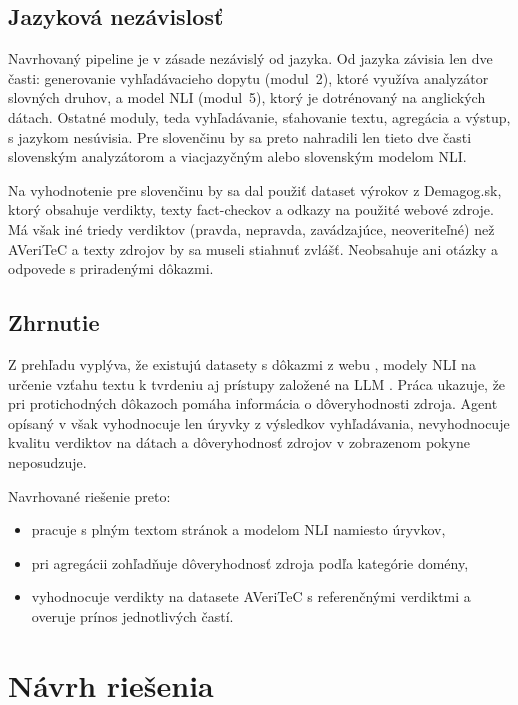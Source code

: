 \documentclass[a4paper,11pt]{article}
\begin{document}
\subsection{Jazyková nezávislosť}

Navrhovaný pipeline je v zásade nezávislý od jazyka. Od jazyka závisia len
dve časti: generovanie vyhľadávacieho dopytu (modul~2), ktoré využíva
analyzátor slovných druhov, a model NLI (modul~5), ktorý je dotrénovaný na
anglických dátach. Ostatné moduly, teda vyhľadávanie, sťahovanie textu,
agregácia a výstup, s jazykom nesúvisia. Pre slovenčinu by sa preto
nahradili len tieto dve časti slovenským analyzátorom a viacjazyčným alebo
slovenským modelom NLI.

Na vyhodnotenie pre slovenčinu by sa dal použiť dataset výrokov
z Demagog.sk, ktorý obsahuje verdikty, texty fact-checkov a odkazy na
použité webové zdroje. Má však iné triedy verdiktov (pravda, nepravda,
zavádzajúce, neoveriteľné) než AVeriTeC a texty zdrojov by sa museli
stiahnuť zvlášť. Neobsahuje ani otázky a odpovede s priradenými dôkazmi.

\subsection{Zhrnutie}

Z prehľadu vyplýva, že existujú datasety s dôkazmi z webu
\cite{schlichtkrull2023averitec}, modely NLI na určenie vzťahu textu
k tvrdeniu \cite{he2023debertav3} aj prístupy založené na LLM
\cite{lewis2020rag, xie2024fire, sevgili2024uhh}. Práca
\cite{ge2025conflicting} ukazuje, že pri protichodných dôkazoch pomáha
informácia o dôveryhodnosti zdroja. Agent opísaný v \cite{nath-agent} však
vyhodnocuje len úryvky z výsledkov vyhľadávania, nevyhodnocuje kvalitu
verdiktov na dátach a dôveryhodnosť zdrojov v zobrazenom pokyne neposudzuje.

Navrhované riešenie preto:
\begin{itemize}
  \item pracuje s plným textom stránok a modelom NLI namiesto úryvkov,
  \item pri agregácii zohľadňuje dôveryhodnosť zdroja podľa kategórie
        domény,
  \item vyhodnocuje verdikty na datasete AVeriTeC s referenčnými
        verdiktmi a overuje prínos jednotlivých častí.
\end{itemize}

\section{Návrh riešenia}
\end{document}

